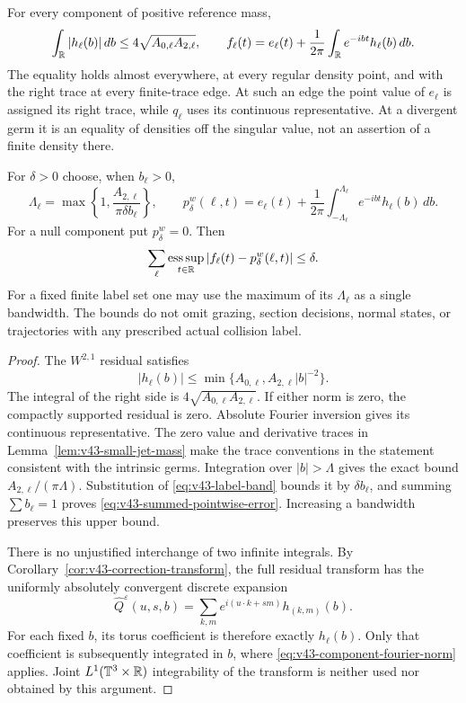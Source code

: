 \begin{theorem}
\label{thm:v43-labelwise-inversion}
For every component of positive reference mass,
\begin{equation}\label{eq:v43-component-fourier-norm}
 \int_\R|h_\ell(b)|\,db\le4\sqrt{A_{0,\ell}A_{2,\ell}},\qquad
 f_\ell(t)=e_\ell(t)+\frac1{2\pi}\int_\R e^{-ibt}h_\ell(b)\,db.
\end{equation}
The equality holds almost everywhere, at every regular density point,
and with the right trace at every finite-trace edge. At such an edge
the point value of $e_\ell$ is assigned its right trace, while
$q_\ell$ uses its continuous representative. At a divergent germ it is an equality of densities off the singular
value, not an assertion of a finite density there.

For $\delta>0$ choose, when $b_\ell>0$,
\begin{equation}\label{eq:v43-label-band}
 \Lambda_\ell=\max\left\{1,\frac{A_{2,\ell}}{\pi\delta b_\ell}\right\},
 \qquad
 p_\delta^w(\ell,t)=e_\ell(t)
       +\frac1{2\pi}\int_{-\Lambda_\ell}^{\Lambda_\ell}
                                            e^{-ibt}h_\ell(b)\,db.
\end{equation}
For a null component put $p_\delta^w=0$. Then
\begin{equation}\label{eq:v43-summed-pointwise-error}
 \sum_\ell\operatorname*{ess\,sup}_{t\in\R}
             |f_\ell(t)-p_\delta^w(\ell,t)|\le\delta.
\end{equation}
For a fixed finite label set one may use the maximum of its
$\Lambda_\ell$ as a single bandwidth. The bounds do not omit grazing,
section decisions, normal states, or trajectories with any prescribed
actual collision label.
\end{theorem}
\begin{proof}
The $W^{2,1}$ residual satisfies
\[
 |h_\ell(b)|\le\min\{A_{0,\ell},A_{2,\ell}|b|^{-2}\}.
\]
The integral of the right side is $4\sqrt{A_{0,\ell}A_{2,\ell}}$.
If either norm is zero, the compactly supported residual is zero.
Absolute Fourier inversion gives its continuous representative. The
zero value and derivative traces in Lemma~\ref{lem:v43-small-jet-mass}
make the trace conventions in the statement consistent with the
intrinsic germs. Integration over $|b|>\Lambda$ gives the exact bound
$A_{2,\ell}/(\pi\Lambda)$. Substitution of
\eqref{eq:v43-label-band} bounds it by $\delta b_\ell$, and summing
$\sum b_\ell=1$ proves \eqref{eq:v43-summed-pointwise-error}.
Increasing a bandwidth preserves this upper bound.

There is no unjustified interchange of two infinite integrals.
By Corollary~\ref{cor:v43-correction-transform}, the full residual
transform has the uniformly absolutely convergent discrete expansion
\[
 \widehat Q^\varepsilon(u,s,b)
     =\sum_{k,m}e^{i(u\cdot k+sm)}h_{(k,m)}(b).
\]
For each fixed $b$, its torus coefficient is therefore exactly
$h_\ell(b)$. Only that coefficient is subsequently integrated in
$b$, where \eqref{eq:v43-component-fourier-norm} applies. Joint
$L^1(\mathbb T^3\times\mathbb R)$ integrability of the transform is neither
used nor obtained by this argument.
\end{proof}

